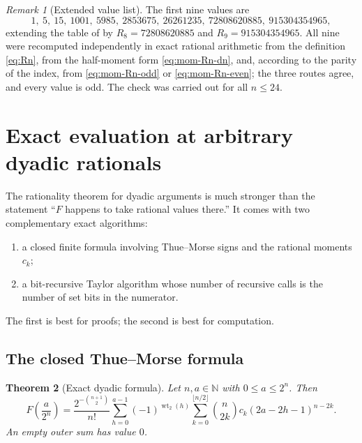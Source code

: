 \documentclass[11pt,oneside]{article}
\newtheorem{theorem}{Theorem}[section]
\theoremstyle{definition}
\theoremstyle{remark}
\newtheorem{remark}[theorem]{Remark}
\newcommand{\N}{\mathbb N}
\newcommand{\wt}{\operatorname{wt}_2}
\begin{document}
\begin{remark}[Extended value list]                         \label{rem:mom-Rn-values}
The first nine values are
\begin{equation}
 1,\ 5,\ 15,\ 1001,\ 5985,\ 2853675,\ 26261235,\ 72808620885,\ 915304354965,
                                                           \label{eq:mom-Rn-values}
\end{equation}
extending the table of  by $R_8=72808620885$ and $R_9=915304354965$.  All nine
were recomputed independently in exact rational arithmetic from the definition \eqref{eq:Rn},
from the half-moment form \eqref{eq:mom-Rn-dn}, and, according to the parity of the index,
from \eqref{eq:mom-Rn-odd} or \eqref{eq:mom-Rn-even}; the three routes agree, and every value
is odd.  The check was carried out for all $n\le24$.
\end{remark}

\section{Exact evaluation at arbitrary dyadic rationals}
\label{sec:dyadic}

The rationality theorem for dyadic arguments is much stronger than the statement
``$F$ happens to take rational values there.''  It comes with two complementary exact
algorithms:
\begin{enumerate}
\item a closed finite formula involving Thue--Morse signs and the rational moments $c_k$;
\item a bit-recursive Taylor algorithm whose number of recursive calls is the number of set
bits in the numerator.
\end{enumerate}
The first is best for proofs; the second is best for computation.

\subsection{The closed Thue--Morse formula}

\begin{theorem}[Exact dyadic formula]
Let $n,a\in\N$ with $0\le a\le2^n$.  Then
\begin{equation}
\boxed{
 F\!\left(\frac{a}{2^n}\right)
 =\frac{2^{-\binom{n+1}{2}}}{n!}
 \sum_{h=0}^{a-1}(-1)^{\wt(h)}
 \sum_{k=0}^{\lfloor n/2\rfloor}
 \binom n{2k}c_k(2a-2h-1)^{n-2k}.}
                                                               \label{eq:dyadic-closed}
\end{equation}
An empty outer sum has value $0$.
\end{theorem}
\end{document}

